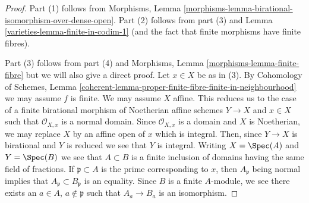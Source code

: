 \begin{proof}

Part (1) follows from Morphisms, Lemma
\ref{morphisms-lemma-birational-isomorphism-over-dense-open}.
Part (2) follows from part (3) and Lemma \ref{varieties-lemma-finite-in-codim-1}
(and the fact that finite morphisms have finite fibres).

\medskip\noindent
Part (3) follows from part (4) and
Morphisms, Lemma \ref{morphisms-lemma-finite-fibre}
but we will also give a direct proof.
Let $x \in X$ be as in (3). By
Cohomology of Schemes, Lemma
\ref{coherent-lemma-proper-finite-fibre-finite-in-neighbourhood}
we may assume $f$ is finite. We may assume $X$ affine.
This reduces us to
the case of a finite birational morphism of Noetherian affine schemes
$Y \to X$ and $x \in X$ such that $\mathcal{O}_{X, x}$ is a
normal domain. Since $\mathcal{O}_{X, x}$ is a domain and $X$
is Noetherian, we may replace $X$ by an affine open of $x$ which
is integral. Then, since $Y \to X$ is birational and $Y$ is reduced
we see that $Y$ is integral. Writing $X = \Spec(A)$ and $Y = \Spec(B)$
we see that $A \subset B$ is a finite inclusion of domains having the same
field of fractions. If $\mathfrak p \subset A$ is the prime corresponding
to $x$, then $A_\mathfrak p$ being normal implies that
$A_\mathfrak p \subset B_\mathfrak p$ is an equality.
Since $B$ is a finite $A$-module, we see there exists an
$a \in A$, $a \not \in \mathfrak p$ such that $A_a \to B_a$
is an isomorphism.


\end{proof}
